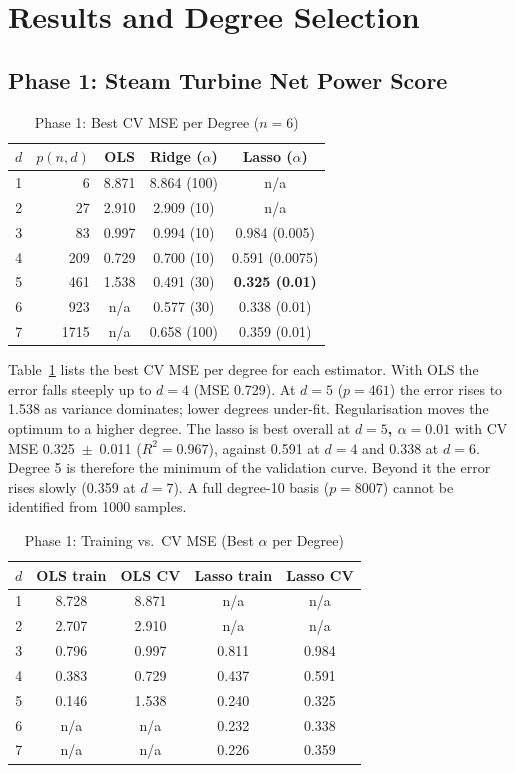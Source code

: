 \documentclass[conference]{IEEEtran}
\begin{document}
\section{Results and Degree Selection}\label{sec:results}
\subsection{Phase 1: Steam Turbine Net Power Score}
\begin{table}[!t]
\renewcommand{\arraystretch}{1.12}
\caption{Phase 1: Best CV MSE per Degree ($n=6$)}
\label{tab:deg1}
\centering\footnotesize
\setlength{\tabcolsep}{4pt}
\begin{tabular}{@{}rrccc@{}}
\toprule
$d$ & $p(n,d)$ & OLS & Ridge ($\alpha$) & Lasso ($\alpha$) \\
\midrule
1 & 6 & 8.871 & 8.864 (100) & n/a \\
2 & 27 & 2.910 & 2.909 (10) & n/a \\
3 & 83 & 0.997 & 0.994 (10) & 0.984 (0.005) \\
4 & 209 & 0.729 & 0.700 (10) & 0.591 (0.0075) \\
5 & 461 & 1.538 & 0.491 (30) & \textbf{0.325 (0.01)} \\
6 & 923 & n/a & 0.577 (30) & 0.338 (0.01) \\
7 & 1715 & n/a & 0.658 (100) & 0.359 (0.01) \\
\bottomrule
\end{tabular}
\end{table}

Table~\ref{tab:deg1} lists the best CV MSE per degree for each estimator. With OLS the error falls steeply up to $d=4$ (MSE 0.729). At $d=5$ ($p=461$) the error rises to 1.538 as variance dominates; lower degrees under-fit. Regularisation moves the optimum to a higher degree. The lasso is best overall at \textbf{$d=5$, $\alpha=0.01$} with CV MSE 0.325~$\pm$~0.011 ($R^2=0.967$), against 0.591 at $d=4$ and 0.338 at $d=6$. Degree 5 is therefore the minimum of the validation curve. Beyond it the error rises slowly (0.359 at $d=7$). A full degree-10 basis ($p=8007$) cannot be identified from 1000 samples.

\begin{table}[!t]
\renewcommand{\arraystretch}{1.12}
\caption{Phase 1: Training vs.\ CV MSE (Best $\alpha$ per Degree)}
\label{tab:gap1}
\centering\footnotesize
\setlength{\tabcolsep}{4pt}
\begin{tabular}{@{}rcccc@{}}
\toprule
$d$ & OLS train & OLS CV & Lasso train & Lasso CV \\
\midrule
1 & 8.728 & 8.871 & n/a & n/a \\
2 & 2.707 & 2.910 & n/a & n/a \\
3 & 0.796 & 0.997 & 0.811 & 0.984 \\
4 & 0.383 & 0.729 & 0.437 & 0.591 \\
5 & 0.146 & 1.538 & 0.240 & 0.325 \\
6 & n/a & n/a & 0.232 & 0.338 \\
7 & n/a & n/a & 0.226 & 0.359 \\
\bottomrule
\end{tabular}
\end{table}
\end{document}
